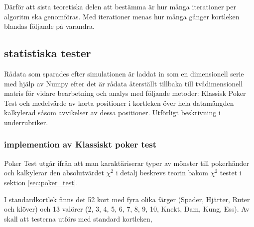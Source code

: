 \documentclass[swedish,a4paper]{article}
\begin{document}
Därför att sista teoretiska delen att bestämma
är hur många iterationer per algoritm ska genomföras. Med iterationer menas
hur många gånger kortleken blandas följande på varandra.

\subsection{statistiska tester}
Rådata som sparades efter simulationen är laddat in som en dimensionell serie
med hjälp av Numpy  efter det är rådata återställt tillbaka till
tvådimensionell matris för vidare bearbetning och analys med följande metoder:
Klassisk Poker Test och medelvärde av korta positioner i kortleken över hela
datamängden kalkylerad såsom avvikelser av dessa positioner. Utförligt
beskrivning i underrubriker. 

\subsubsection{implemention av Klassiskt poker test}
Poker Test utgår ifrån att man karaktäriserar typer av mönster till 
pokerhänder och kalkylerar  den absolutvärdet $\chi^2$ i detalj beskrevs
teorin bakom $\chi^2$ testet i sektion
\ref{sec:poker_test}. 

I standardkortlek finns det 52 kort med fyra olika 
färger (Spader, Hjärter, Ruter och klöver) och 13 valörer 
(2, 3, 4, 5, 6, 7, 8, 9, 10, Knekt, Dam, Kung, Ess).
Av skall att testerna utförs med standard kortleken,
\end{document}
